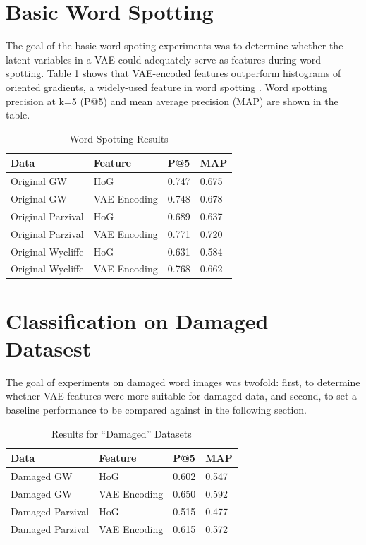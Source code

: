\documentclass[final]{ukthesis}
\begin{document}
%
%
\section{Basic Word Spotting}
The goal of the basic word spoting experiments was to determine whether the latent variables in a VAE could adequately serve as features during word spotting. Table \ref{table:word-spotting} shows that VAE-encoded features outperform histograms of oriented gradients, a widely-used feature in word spotting \cite{giotis2017survey}. Word spotting precision at k=5 (P@5) and mean average precision (MAP) are shown in the table.

\begin{table}[h]
\centering
\begin{tabular}{llll}
\textbf{Data}  & \textbf{Feature} & \textbf{P@5} & \textbf{MAP} \\
\hline
Original GW    & HoG			& 0.747          & 0.675          \\
Original GW    & VAE Encoding 	& 0.748          & 0.678          \\
Original Parzival & HoG                     & 0.689          & 0.637          \\
Original Parzival & VAE Encoding 	& 0.771          & 0.720          \\
Original Wycliffe & HoG			& 0.631          & 0.584          \\
Original Wycliffe & VAE Encoding	& 0.768          & 0.662         
\end{tabular}
\caption{Word Spotting Results}
\label{table:word-spotting}
\end{table}




%
%
\section{Classification on Damaged Datasest}
The goal of experiments on damaged word images was twofold: first, to determine whether VAE features were more suitable for damaged data, and second, to set a baseline performance to be compared against in the following section.

\begin{table}[h]
\centering
\begin{tabular}{llll}
\textbf{Data}  & \textbf{Feature} & \textbf{P@5} & \textbf{MAP} \\
\hline
Damaged GW    & HoG			& 0.602          & 0.547          \\
Damaged GW    & VAE Encoding 	& 0.650          & 0.592          \\
Damaged Parzival & HoG                     & 0.515          & 0.477          \\
Damaged Parzival & VAE Encoding 	& 0.615          & 0.572          \\   
\end{tabular}
\caption{Results for ``Damaged'' Datasets}
\label{my-label}
\end{table}
\end{document}
